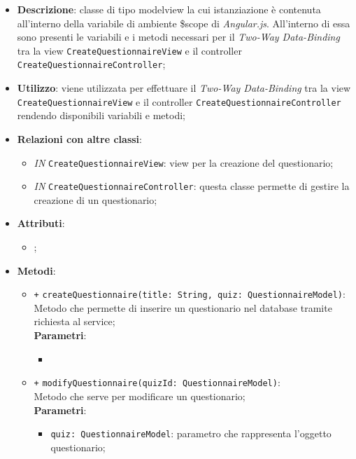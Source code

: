 	\begin{itemize}
		\item \textbf{Descrizione}: classe di tipo modelview la cui istanziazione è contenuta all'interno della variabile di ambiente \$scope di \textit{Angular.js}. All'interno di essa sono presenti le variabili e i metodi necessari per il \textit{Two-Way Data-Binding} tra la view \texttt{CreateQuestionnaireView} e il controller \texttt{CreateQuestionnaireController};
		\item \textbf{Utilizzo}: viene utilizzata per effettuare il \textit{Two-Way Data-Binding} tra la view \texttt{CreateQuestionnaireView} e il controller \texttt{CreateQuestionnaireController} rendendo disponibili variabili e metodi;
		\item \textbf{Relazioni con altre classi}: 
		\begin{itemize}
			\item \textit{IN} \texttt{CreateQuestionnaireView}: view per la creazione del questionario; 
			\item \textit{IN} \texttt{CreateQuestionnaireController}: questa classe permette di gestire la creazione di un questionario;
		\end{itemize}
		\item \textbf{Attributi}: 
		\begin{itemize}
			\item ;
		\end{itemize}
		\item \textbf{Metodi}: 
		\begin{itemize}
			\item \texttt{+} \texttt{createQuestionnaire(title: String, quiz: QuestionnaireModel)}: \\Metodo che permette di inserire un questionario nel database tramite richiesta al service; \\
			\textbf{Parametri}:
			\begin{itemize}
				\item 
			\end{itemize}
			\item \texttt{+} \texttt{modifyQuestionnaire(quizId: QuestionnaireModel)}: \\ Metodo che serve per modificare un questionario; \\
			\textbf{Parametri}:
			\begin{itemize}
				\item \texttt{quiz: QuestionnaireModel}: parametro che rappresenta l'oggetto questionario;
			\end{itemize}

\end{itemize}
\end{itemize}
